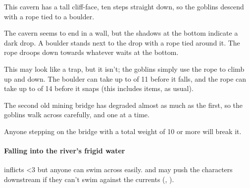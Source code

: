 \begin{multicols}{2}
\null


\begin{exampletext}
  This cavern has a tall cliff-face, ten \glspl{step} straight down, so the goblins descend with a rope tied to a boulder.
\end{exampletext}

\begin{boxtext}
  The cavern seems to end in a wall, but the shadows at the bottom indicate a dark drop.
  A boulder stands next to the drop with a rope tied around it.
  The rope droops down towards whatever waits at the bottom.
\end{boxtext}

This may look like a trap, but it isn't; the goblins simply use the rope to climb up and down.
The boulder can take up to  of 11 before it falls, and the rope can take up to  of 14 before it snaps (this includes items, as usual).




\begin{exampletext}
  The second old mining bridge has degraded almost as much as the first, so the goblins walk across carefully, and one at a time.
\end{exampletext}

Anyone stepping on the bridge with a total \gls{weight} of 10 or more will break it.

\paragraph{Falling into the river's frigid water}
inflicts 
\ifnum\value{temperature}<3%
  but anyone can swim across easily.
\else%
  and may push the characters downstream if they can't swim against the currents (, \tn[5]).
\fi%




\end{multicols}
